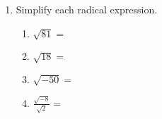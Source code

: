 \documentclass[12pt, twoside]{article}
\begin{document}
\begin{enumerate}
\item Simplify each radical expression.
    \begin{multicols}{2}
    \begin{enumerate}[itemsep=0.5cm]
        \item $\sqrt{81}=$
        \item $\sqrt{18}=$
        \item $\sqrt{-50}=$
        \item $\displaystyle \frac{\sqrt{-8}}{\sqrt{2}}=$
    \end{enumerate}
    \end{multicols}


\end{enumerate}
\end{document}
